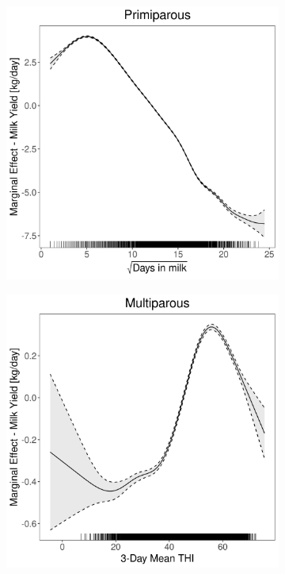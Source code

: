 \begin{figure}[H]
\begin{subfigure}[b]{0.45\textwidth}
    \end{subfigure}
    \hspace{0.05\textwidth} %
    \begin{subfigure}[b]{0.45\textwidth}
        \centering
        \includegraphics[width=\textwidth]{thesis/figures/models/milk/before2010/si_milk_before2010/si_milk_before2010_marginal_dim_milk_primi.png}
    \end{subfigure}
    \begin{subfigure}[b]{0.45\textwidth}
        \centering
        \includegraphics[width=\textwidth]{thesis/figures/models/milk/before2010/si_milk_before2010/si_milk_before2010_marginal_thi_milk_multi.png}

\end{subfigure}
\end{figure}
